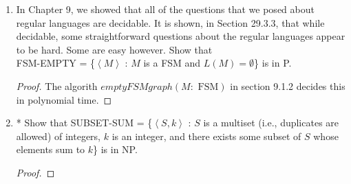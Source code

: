 \documentclass[10pt]{article}
\newcommand{\brackets}[1]{\left< #1 \right>}
\begin{document}
\begin{enumerate}[1)]

\item
In Chapter 9, we showed that all of the questions that we posed about regular languages are decidable.  It is shown,
in Section 29.3.3, that while decidable, some straightforward questions about the regular languages appear to be
hard.  Some are easy however.  Show that\\ FSM-EMPTY = \{$\brackets{M}$ : $M$ is a FSM and $L(M) = \emptyset$\} is in P.
\begin{proof}[Proof]
The algorith $emptyFSMgraph(M:\textrm{ FSM})$ in section 9.1.2 decides this in polynomial time.
\end{proof}


\item
* Show that SUBSET-SUM = \{$\brackets{S, k}$ : $S$ is a multiset (i.e., duplicates are allowed) of integers, $k$ is an integer, and
there exists some subset of $S$ whose elements sum to $k$\} is in NP.
\begin{proof}[Proof]
\end{proof}



\end{enumerate}
\end{document}

